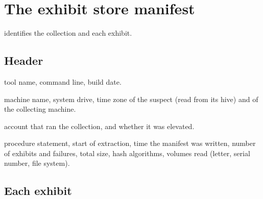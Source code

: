 \documentclass[11pt,a4paper,oneside]{report}
\begin{document}
\section{The exhibit store manifest}

 identifies the collection and each exhibit.

\subsection{Header}

\begin{description}[style=nextline,leftmargin=1.2em]
  \item[\champ{Tool}] tool name, command line, build date.
  \item[\champ{Host}] machine name, system drive, time zone of the suspect (read
        from its  hive) and of the collecting machine.
  \item[\champ{Operator}] account that ran the collection, and whether it was
        elevated.
  \item[\champ{Custody}] procedure statement, start of extraction, time the
        manifest was written, number of exhibits and failures, total size, hash
        algorithms, volumes read (letter, serial number, file system).
\end{description}

\subsection{Each exhibit}
\end{document}
